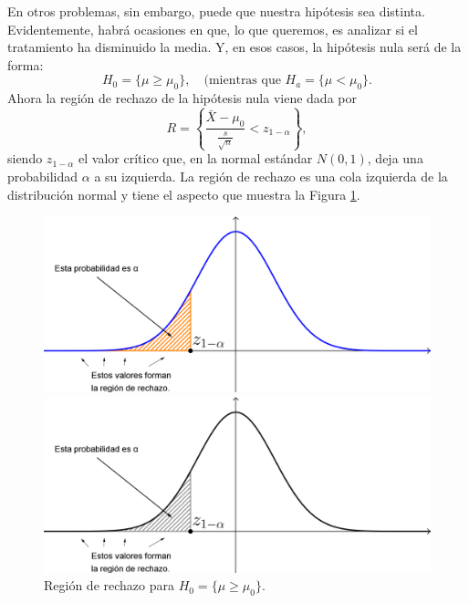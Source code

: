En otros problemas, sin embargo, puede que nuestra hipótesis sea distinta. Evidentemente, habrá ocasiones en que, lo que queremos, es analizar si el tratamiento ha disminuido la media. Y, en esos casos, la hipótesis nula será de la forma:
    \[H_0=\{\mu\geq \mu_0\},\quad \mbox{(mientras que  } H_a=\{\mu<\mu_0\}.\]
Ahora la región de rechazo de la hipótesis nula viene dada por
    \begin{equation}\label{cap07:ecu:RegionRechazoMediaZColaIzquierda}
        R=\left\{\dfrac{\bar X-\mu_0}{\frac{s}{\sqrt{n}}}<z_{1-\alpha}\right\},
    \end{equation}
siendo $z_{1-\alpha}$ el valor crítico que, en la normal estándar  $N(0,1)$, deja una probabilidad $\alpha$ a su izquierda. La región de rechazo es una cola izquierda de la distribución normal y tiene el aspecto que muestra la Figura \ref{cap07:fig:RegionRechazoNormalColaIzquierda}.

\begin{figure}[htbp]
\begin{center}
\begin{enColor}
\includegraphics[width=13cm]{../fig/Cap07-RegionRechazoNormalColaIzquierda.png}
\end{enColor}
\begin{bn}
\includegraphics[width=13cm]{../fig/Cap07-RegionRechazoNormalColaIzquierda-bn.png}
\end{bn}
\caption{Regi\'on de rechazo para $H_0=\{\mu\geq \mu_0\}$.}
\label{cap07:fig:RegionRechazoNormalColaIzquierda}
\end{center}
\end{figure}

